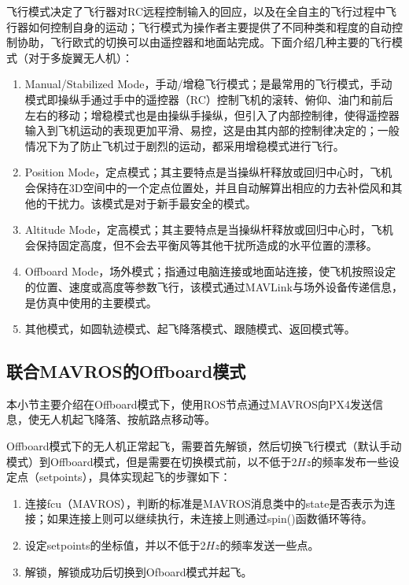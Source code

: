 飞行模式决定了飞行器对RC远程控制输入的回应，以及在全自主的飞行过程中飞行器如何控制自身的运动；飞行模式为操作者主要提供了不同种类和程度的自动控制协助，飞行欧式的切换可以由遥控器和地面站完成。下面介绍几种主要的飞行模式（对于多旋翼无人机）：
\begin{enumerate}
	\item 
	Manual/Stabilized Mode，手动/增稳飞行模式；是最常用的飞行模式，手动模式即操纵手通过手中的遥控器（RC）控制飞机的滚转、俯仰、油门和前后左右的移动；增稳模式也是由操纵手操纵，但引入了内部控制律，使得遥控器输入到飞机运动的表现更加平滑、易控，这是由其内部的控制律决定的；一般情况下为了防止飞机过于剧烈的运动，都采用增稳模式进行飞行。
	\item 
	Position Mode，定点模式；其主要特点是当操纵杆释放或回归中心时，飞机会保持在3D空间中的一个定点位置处，并且自动解算出相应的力去补偿风和其他的干扰力。该模式是对于新手最安全的模式。
	\item
	Altitude Mode，定高模式；其主要特点是当操纵杆释放或回归中心时，飞机会保持固定高度，但不会去平衡风等其他干扰所造成的水平位置的漂移。
	\item 
	Offboard Mode，场外模式；指通过电脑连接或地面站连接，使飞机按照设定的位置、速度或高度等参数飞行，该模式通过MAVLink与场外设备传递信息，是仿真中使用的主要模式。
	\item 
	其他模式，如圆轨迹模式、起飞降落模式、跟随模式、返回模式等。
\end{enumerate}

\subsection{联合MAVROS的Offboard模式} \label{2.2.3}
本小节主要介绍在Offboard模式下，使用ROS节点通过MAVROS向PX4发送信息，使无人机起飞降落、按航路点移动等。

Offboard模式下的无人机正常起飞，需要首先解锁，然后切换飞行模式（默认手动模式）到Offboard模式，但是需要在切换模式前，以不低于2$Hz$的频率发布一些设定点（setpoints），具体实现起飞的步骤如下：

\begin{enumerate}
	\item 
	连接fcu（MAVROS），判断的标准是MAVROS消息类中的state是否表示为连接；如果连接上则可以继续执行，未连接上则通过spin()函数循环等待。
	\item 
	设定setpoints的坐标值，并以不低于2$Hz$的频率发送一些点。
	\item 
	解锁，解锁成功后切换到Ofboard模式并起飞。
\end{enumerate}

